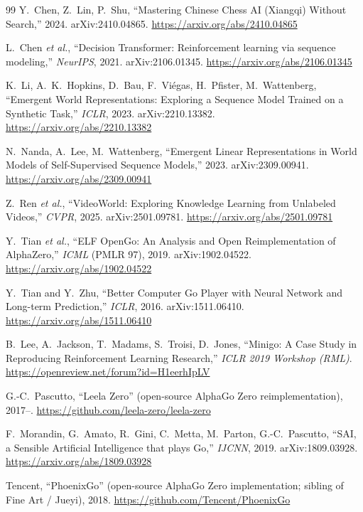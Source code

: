 \documentclass[11pt]{article}
\begin{document}
\begin{thebibliography}{99}
 Y.~Chen, Z.~Lin, P.~Shu,
  ``Mastering Chinese Chess AI (Xiangqi) Without Search,'' 2024. arXiv:2410.04865.
  \url{https://arxiv.org/abs/2410.04865}

 L.~Chen \emph{et al.},
  ``Decision Transformer: Reinforcement learning via sequence modeling,''
  \emph{NeurIPS}, 2021. arXiv:2106.01345. \url{https://arxiv.org/abs/2106.01345}

 K.~Li, A.~K.~Hopkins, D.~Bau, F.~Vi\'egas, H.~Pfister,
  M.~Wattenberg,
  ``Emergent World Representations: Exploring a Sequence Model Trained on a Synthetic
  Task,'' \emph{ICLR}, 2023. arXiv:2210.13382. \url{https://arxiv.org/abs/2210.13382}

 N.~Nanda, A.~Lee, M.~Wattenberg,
  ``Emergent Linear Representations in World Models of Self-Supervised Sequence Models,''
  2023. arXiv:2309.00941. \url{https://arxiv.org/abs/2309.00941}

 Z.~Ren \emph{et al.},
  ``VideoWorld: Exploring Knowledge Learning from Unlabeled Videos,''
  \emph{CVPR}, 2025. arXiv:2501.09781. \url{https://arxiv.org/abs/2501.09781}

 Y.~Tian \emph{et al.},
  ``ELF OpenGo: An Analysis and Open Reimplementation of AlphaZero,''
  \emph{ICML} (PMLR 97), 2019. arXiv:1902.04522. \url{https://arxiv.org/abs/1902.04522}

 Y.~Tian and Y.~Zhu,
  ``Better Computer Go Player with Neural Network and Long-term Prediction,''
  \emph{ICLR}, 2016. arXiv:1511.06410. \url{https://arxiv.org/abs/1511.06410}

 B.~Lee, A.~Jackson, T.~Madams, S.~Troisi, D.~Jones,
  ``Minigo: A Case Study in Reproducing Reinforcement Learning Research,''
  \emph{ICLR 2019 Workshop (RML)}.
  \url{https://openreview.net/forum?id=H1eerhIpLV}

 G.-C.~Pascutto,
  ``Leela Zero'' (open-source AlphaGo Zero reimplementation), 2017--.
  \url{https://github.com/leela-zero/leela-zero}

 F.~Morandin, G.~Amato, R.~Gini, C.~Metta, M.~Parton, G.-C.~Pascutto,
  ``SAI, a Sensible Artificial Intelligence that plays Go,'' \emph{IJCNN}, 2019.
  arXiv:1809.03928. \url{https://arxiv.org/abs/1809.03928}

 Tencent,
  ``PhoenixGo'' (open-source AlphaGo Zero implementation; sibling of Fine Art / Jueyi), 2018.
  \url{https://github.com/Tencent/PhoenixGo}


\end{thebibliography}
\end{document}
